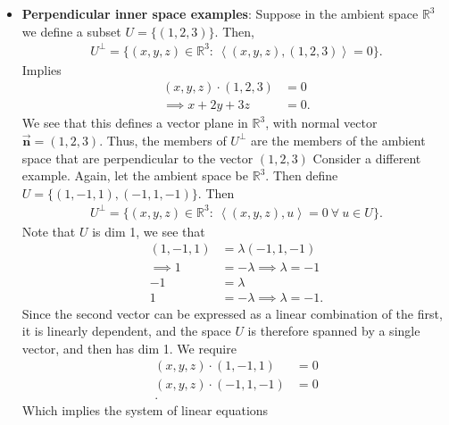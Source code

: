 \documentclass{report}
\begin{document}
\begin{itemize}
\begin{enumerate}
            \end{enumerate}
        \item \textbf{Perpendicular inner space examples}: Suppose in the ambient space $\mathbb{R}^{3}$ we define a subset $U = \{(1,2,3)\}$. Then,
            \begin{align*}
                U^{\perp} = \{ (x,y,z) \in \mathbb{R}^{3}:\ \left\langle (x,y,z), (1,2,3)  \right\rangle = 0\}
            .\end{align*}
            Implies
            \begin{align*}
                (x,y,z) \cdot (1,2,3) &= 0 \\
                \implies x + 2y + 3z &= 0
            .\end{align*}
            We see that this defines a vector plane in $\mathbb{R}^{3}$, with normal vector $\vec{\mathbf{n}} = (1,2,3)$. Thus, the members of $U^{\perp}$ are the members of the ambient space that are perpendicular to the vector $(1,2,3)$
            \bigbreak \noindent 
            Consider a different example. Again, let the ambient space be $\mathbb{R}^{3}$. Then define $U = \{(1,-1,1), (-1,1,-1)\}$. Then
            \begin{align*}
                U^{\perp} = \{(x,y,z) \in \mathbb{R}^{3}:\ \left\langle (x,y,z), u\right\rangle = 0 \ \forall \ u \in U\}
            .\end{align*}
            \bigbreak \noindent 
            Note that $U$ is dim 1, we see that
            \begin{align*}
                (1,-1,1) &= \lambda(-1,1,-1) \\
                \implies 1 &= -\lambda \implies \lambda = -1\\
                -1 &= \lambda \\
                1 &= -\lambda \implies \lambda = -1
            .\end{align*}
            Since the second vector can be expressed as a linear combination of the first, it is linearly dependent, and the space $U$ is therefore spanned by a single vector, and then has dim 1.
            \bigbreak \noindent 
            We require
            \begin{align*}
                (x,y,z) \cdot  (1,-1,1) &= 0 \\
                (x,y,z) \cdot  (-1,1,-1) &= 0 \\
            .\end{align*}
            Which implies the system of linear equations
            \begin{align*}

\end{align*}
\end{itemize}
\end{document}
